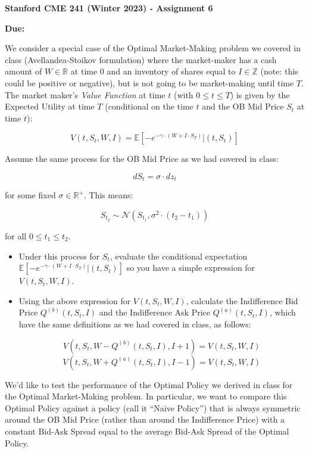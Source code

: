 \documentclass[12pt]{exam}
\begin{document}
\begin{center}
{\large {\bf Stanford CME 241 (Winter 2023) - Assignment 6}}
\end{center}
 
{\large{\bf Due:}}
\begin{questions}
\question We consider a special case of the Optimal Market-Making problem we covered in class (Avellandea-Stoikov formulation) where the market-maker has a cash amount of $W \in \mathbb{R}$ at time 0 and an inventory of shares equal to $I \in \mathbb{Z}$ (note: this could be positive or negative), but is not going to be market-making until time $T$. The market maker's {\em Value Function} at time $t$ (with $0 \leq t \leq T$) is given by the Expected Utility at time $T$ (conditional on the time $t$ and the OB Mid Price $S_t$ at time $t$):

$$V(t, S_t, W, I) = \mathbb{E}[-e^{-\gamma \cdot (W + I \cdot S_T)} | (t, S_t)]$$

Assume the same process for the OB Mid Price as we had covered in class:

$$dS_t = \sigma \cdot dz_t$$

for some fixed $\sigma \in \mathbb{R}^+$. This means:

$$S_{t_2} \sim \mathcal{N}(S_{t_1}, \sigma^2 \cdot (t_2 - t_1))$$

for all $0 \leq t_1 \leq t_2$.

\begin{itemize}
\item Under this process for $S_t$, evaluate the conditional expectation $\mathbb{E}[-e^{-\gamma \cdot (W + I \cdot S_T)} | (t, S_t)]$ so you have a simple expression for $V(t, S_t, W, I)$.
\item Using the above expression for $V(t, S_t, W, I)$, calculate the Indifference Bid Price $Q^{(b)}(t, S_t, I)$ and the Indifference Ask Price $Q^{(a)}(t,S_t,I)$, which have the same definitions as we had covered in class, as follows:

$$V(t,S_t,W - Q^{(b)}(t, S_t, I), I + 1) = V(t,S_t,W, I)$$
$$V(t,S_t,W + Q^{(a)}(t, S_t, I), I - 1) = V(t,S_t,W, I)$$
\end{itemize}

\question We'd like to test the performance of the Optimal Policy we derived in class for the Optimal Market-Making problem. In particular, we want to compare this Optimal Policy against a policy (call it ``Naive Policy'') that is always symmetric around the OB Mid Price (rather than around the Indifference Price) with a constant Bid-Ask Spread equal to the average Bid-Ask Spread of the Optimal Policy.


\end{questions}
\end{document}
